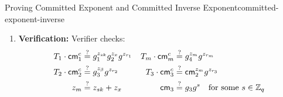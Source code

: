 \begin{protocol}{Proving Committed Exponent and Committed Inverse Exponent}{committed-exponent-inverse}
\begin{enumerate}
    \item \textbf{Verification:} Verifier checks:
    \begin{align*}
        T_1 \cdot \mathsf{cm}_1^c &\stackrel{?}{=} g_1^{z_{sk}} g_2^{z_x} g^{z_{r_1}} &
        T_m \cdot \mathsf{cm}_m^c &\stackrel{?}{=} g_4^{z_m} g^{z_{r_m}} \\
        T_2 \cdot \mathsf{cm}_2^c &\stackrel{?}{=} g_3^{z_\beta} g^{z_{r_2}} &
        T_3 \cdot \mathsf{cm}_3^c &\stackrel{?}{=} \mathsf{cm}_2^{z_m} g^{z_{r_3}} \\
        z_m &\stackrel{?}{=} z_{sk} + z_x &
        \mathsf{cm}_3 &\stackrel{?}{=} g_3 g^{s} \quad \text{for some } s \in \mathbb{Z}_q
    \end{align*}
\end{enumerate}
\end{protocol}







